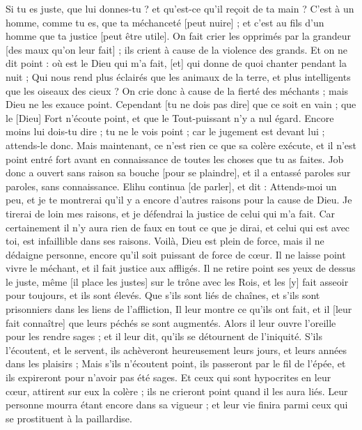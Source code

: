 \begin{multicols}{2}
Si tu es juste, que lui donnes-tu ? et qu'est-ce qu'il reçoit de ta main ?
C'est à un homme, comme tu es, que ta méchanceté [peut nuire] ; et c'est au fils d'un homme que ta justice [peut être utile].
On fait crier les opprimés par la grandeur [des maux qu'on leur fait] ; ils crient à cause de la violence des grands.
Et on ne dit point : où est le Dieu qui m'a fait, [et] qui donne de quoi chanter pendant la nuit ;
Qui nous rend plus éclairés que les animaux de la terre, et plus intelligents que les oiseaux des cieux ?
On crie donc à cause de la fierté des méchants ; mais Dieu ne les exauce point.
Cependant [tu ne dois pas dire] que ce soit en vain ; que le [Dieu] Fort n'écoute point, et que le Tout-puissant n'y a nul égard.
Encore moins lui dois-tu dire ; tu ne le vois point ; car le jugement est devant lui ; attends-le donc.
Mais maintenant, ce n'est rien ce que sa colère exécute, et il n'est point entré fort avant en connaissance de toutes les choses que tu as faites.
Job donc a ouvert sans raison sa bouche [pour se plaindre], et il a entassé paroles sur paroles, sans connaissance.
\VerseOne{}Elihu continua [de parler], et dit :
Attends-moi un peu, et je te montrerai qu'il y a encore d'autres raisons pour la cause de Dieu.
Je tirerai de loin mes raisons, et je défendrai la justice de celui qui m'a fait.
Car certainement il n'y aura rien de faux en tout ce que je dirai, et celui qui est avec toi, est infaillible dans ses raisons.
Voilà, Dieu est plein de force, mais il ne dédaigne personne, encore qu'il soit puissant de force de cœur.
Il ne laisse point vivre le méchant, et il fait justice aux affligés.
Il ne retire point ses yeux de dessus le juste, même [il place les justes] sur le trône avec les Rois, et les [y] fait asseoir pour toujours, et ils sont élevés.
Que s'ils sont liés de chaînes, et s'ils sont prisonniers dans les liens de l'affliction,
Il leur montre ce qu'ils ont fait, et il [leur fait connaître] que leurs péchés se sont augmentés.
Alors il leur ouvre l'oreille pour les rendre sages ; et il leur dit, qu'ils se détournent de l'iniquité.
S'ils l'écoutent, et le servent, ils achèveront heureusement leurs jours, et leurs années dans les plaisirs ;
Mais s'ils n'écoutent point, ils passeront par le fil de l'épée, et ils expireront pour n'avoir pas été sages.
Et ceux qui sont hypocrites en leur cœur, attirent sur eux la colère ; ils ne crieront point quand il les aura liés.
Leur personne mourra étant encore dans sa vigueur ; et leur vie finira parmi ceux qui se prostituent à la paillardise.

\end{multicols}
